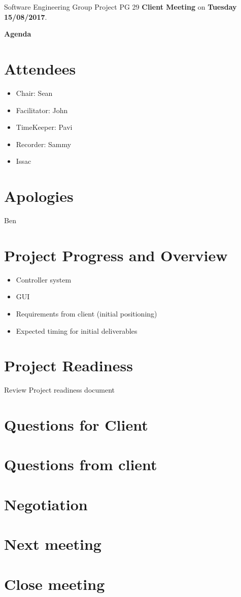 \documentclass[11pt, a4paper]{article}
\begin{document}
\noindent Software Engineering Group Project PG 29 {\bf Client Meeting} on {\bf Tuesday 15/08/2017}.
\vspace*{10pt}
\begin{center}
\huge \bf Agenda
\end{center}

\section{Attendees}
\begin{itemize}
\item Chair: Sean
\item Facilitator: John
\item TimeKeeper: Pavi
\item Recorder: Sammy
\item Issac
\end{itemize}

\section{Apologies}
\item Ben

\section{Project Progress and Overview}
\begin{itemize}
	\item Controller system 
	\item GUI
	\item Requirements from client (initial positioning)
	\item Expected timing for initial deliverables
\end{itemize}

\section{Project Readiness}
Review Project readiness document

\section{Questions for Client}


\section{Questions from client}


\section{Negotiation}


\section{Next meeting}

\section {Close meeting}
\vspace*{10pt}
\end{document}
